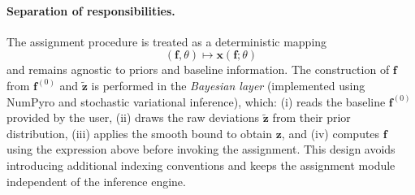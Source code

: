 \paragraph{Separation of responsibilities.}
The assignment procedure is treated as a deterministic mapping
\[
(\bm f,\theta)\longmapsto \bm x(\bm f;\theta)
\]
and remains agnostic to priors and baseline information. The construction of $\bm f$ from
$\bm f^{(0)}$ and $\widetilde{\bm z}$ is performed in the \emph{Bayesian layer} (implemented using NumPyro and
stochastic variational inference), which: (i) reads the baseline $\bm f^{(0)}$ provided by the user,
(ii) draws the raw deviations $\widetilde{\bm z}$ from their prior distribution,
(iii) applies the smooth bound to obtain $\bm z$, and (iv) computes $\bm f$ using the
expression above before invoking the assignment. This design avoids introducing additional indexing
conventions and keeps the assignment module independent of the inference engine.


